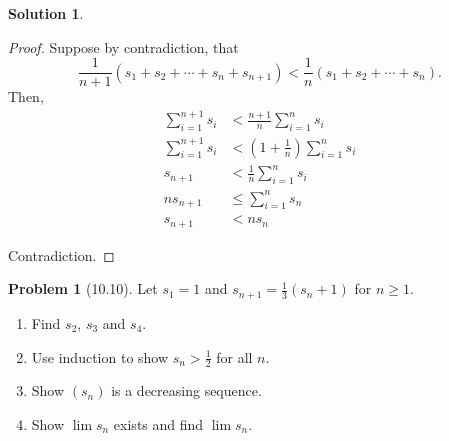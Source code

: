 \documentclass[12pt]{article}
\theoremstyle{definition} %
\newtheorem{solution}{Solution}
\newtheorem{problem}{Problem}
\theoremstyle{plain} %
\begin{document}
\begin{solution}
    \begin{proof}
        Suppose by contradiction, that 
        \[
        \frac{1}{n+1}(s_1 + s_2 + \cdots + s_n + s_{n+1}) < \frac{1}{n}(s_1 + s_2 + \cdots + s_n).
        \]
        Then,
        \begin{align}
            \sum_{i=1}^{n+1} s_i &< \frac{n+1}{n} \sum_{i=1}^n s_i \tag{48} \\
            \sum_{i=1}^{n+1} s_i &< \left( 1 + \frac{1}{n} \right) \sum_{i=1}^n s_i \tag{49} \\
            s_{n+1} &< \frac{1}{n} \sum_{i=1}^n s_i \tag{50} \\
            ns_{n+1} &\leq \sum_{i=1}^n s_n \tag{51} \\
            s_{n+1} &< ns_n \tag{52}
        \end{align}
    
        Contradiction.
    \end{proof}
\end{solution}

\begin{problem}[10.10]
    Let $s_1 = 1$ and $s_{n+1} = \frac{1}{3}(s_n + 1)$ for $n \geq 1$. 
    \begin{enumerate}[label=(\alph*)]
        \item Find $s_2$, $s_3$ and $s_4$.
        \item Use induction to show $s_n > \frac{1}{2}$ for all $n$.
        \item Show $(s_n)$ is a decreasing sequence.
        \item Show $\lim s_n$ exists and find $\lim s_n$.
    \end{enumerate}
\end{problem}
\end{document}
